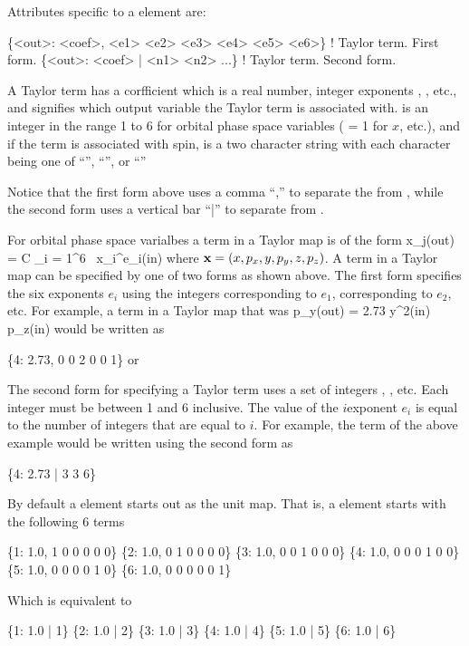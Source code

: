 {Attributes specific to a  element are:
\begin{example}
  \{<out>: <coef>, <e1> <e2> <e3> <e4> <e5> <e6>\}  ! Taylor term. First form.
  \{<out>: <coef> | <n1> <n2> ...\}                 ! Taylor term. Second form.
\end{example}
A Taylor term has a corfficient  which is a real number,
integer exponents , , etc., and  signifies
which output variable the Taylor term is associated with. 
is an integer in the range 1 to 6 for orbital phase space variables
( = 1 for $x$, etc.), and if the term is associated with
spin,  is a two character string with each character being
one of ``'', ``'', or ``''

Notice that the first form above uses a comma ``,'' to separate the
 from , while the second form uses a vertical bar
``|'' to separate  from .

For orbital phase space varialbes a term in a Taylor map is of the form
\Begineq
  x_j({\rm out}) = C \cdot \Pi_{i = 1}^6 \, x_i^{e_i}({\rm in})
\Endeq
where ${\bf x} = (x, p_x, y, p_y, z, p_z)$. A term in a Taylor map can
be specified by one of two forms as shown above. The first form specifies
the six exponents $e_i$ using the integers  corresponding to
$e_1$,  corresponding to $e_2$, etc.  For example, a term in
a Taylor map that was
\Begineq
  p_y({\rm out}) = 2.73 \cdot y^2({\rm in}) \, p_z({\rm in})
\Endeq
would be written as
\begin{example}
  \{4: 2.73, 0 0 2 0 0 1\} or
\end{example}

The second form for specifying a Taylor term uses a set of integers ,
, etc. Each integer must be between 1 and 6 inclusive. The value of 
the $i$\Th exponent $e_i$ is equal to the number of integers that are equal
to $i$. For example, the term of the above example would be written using
the second form as
\begin{example}
  \{4: 2.73 | 3 3 6\}
\end{example}

By default a  element starts out as the unit map. 
That is, a  element starts with the following 6 terms
\begin{example}
  \{1: 1.0, 1 0 0 0 0 0\}
  \{2: 1.0, 0 1 0 0 0 0\}
  \{3: 1.0, 0 0 1 0 0 0\}
  \{4: 1.0, 0 0 0 1 0 0\}
  \{5: 1.0, 0 0 0 0 1 0\}
  \{6: 1.0, 0 0 0 0 0 1\}
\end{example}
Which is equivalent to
\begin{example}
  \{1: 1.0 | 1\}
  \{2: 1.0 | 2\}
  \{3: 1.0 | 3\}
  \{4: 1.0 | 4\}
  \{5: 1.0 | 5\}
  \{6: 1.0 | 6\}
\end{example}

}

